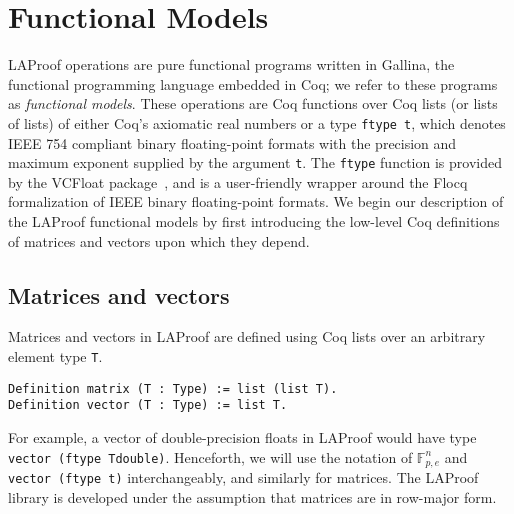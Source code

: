 \section{Functional Models} %
\label{sec:models}
LAProof operations are pure functional programs written in Gallina, the functional programming
language embedded in Coq; we refer to these programs as 
\emph{functional models}. These operations are Coq functions 
over Coq lists (or lists of lists) of either Coq's axiomatic 
real numbers or a type \lstinline{ftype t}, which denotes IEEE 
754 compliant binary floating-point formats with the precision 
and maximum exponent supplied by the argument \lstinline{t}. 
The \lstinline{ftype} function is provided by the VCFloat 
package~\cite{vcfloat1,vcfloat2}, and is a user-friendly 
wrapper around the Flocq formalization of IEEE binary 
floating-point formats. We begin our description of the 
LAProof functional models by first introducing the low-level Coq 
definitions of matrices and vectors upon which they depend.

\subsection{Matrices and vectors}
Matrices and vectors in LAProof are defined using Coq lists over an arbitrary element type \lstinline{T}. 
% 
\begin{lstlisting}
Definition matrix (T : Type) := list (list T).
Definition vector (T : Type) := list T.
 \end{lstlisting} \vspace{-1em}
%
For example, a vector of double-precision floats in LAProof would have type \lstinline{vector (ftype Tdouble)}. Henceforth, we will use the notation of $\mathbb{F}^n_{p,e}$ and \lstinline{vector (ftype t)} interchangeably, and similarly for matrices. The LAProof library is developed under the assumption that matrices are in row-major form. 

